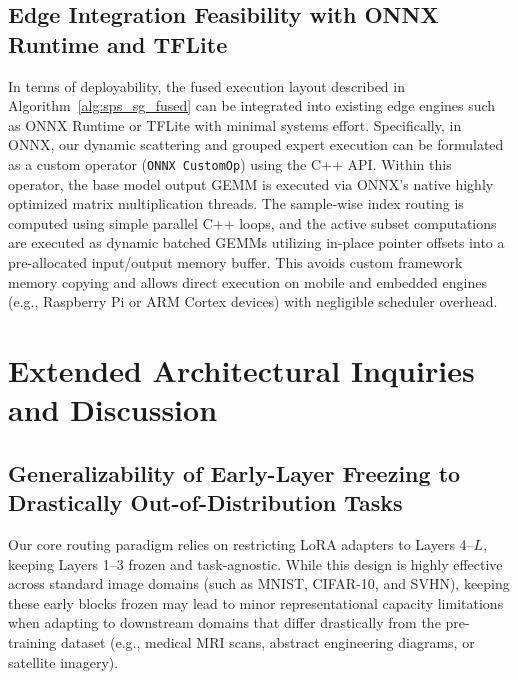 \documentclass{article}
\theoremstyle{plain}
\theoremstyle{definition}
\theoremstyle{remark}
\begin{document}
\subsection{Edge Integration Feasibility with ONNX Runtime and TFLite}
In terms of deployability, the fused execution layout described in Algorithm~\ref{alg:sps_sg_fused} can be integrated into existing edge engines such as ONNX Runtime or TFLite with minimal systems effort. Specifically, in ONNX, our dynamic scattering and grouped expert execution can be formulated as a custom operator (\texttt{ONNX CustomOp}) using the C++ API. Within this operator, the base model output GEMM is executed via ONNX's native highly optimized matrix multiplication threads. The sample-wise index routing is computed using simple parallel C++ loops, and the active subset computations are executed as dynamic batched GEMMs utilizing in-place pointer offsets into a pre-allocated input/output memory buffer. This avoids custom framework memory copying and allows direct execution on mobile and embedded engines (e.g., Raspberry Pi or ARM Cortex devices) with negligible scheduler overhead.

\section{Extended Architectural Inquiries and Discussion}
\label{sec:appendix_discussion}

\subsection{Generalizability of Early-Layer Freezing to Drastically Out-of-Distribution Tasks}
\label{subsec:appendix_ood}
Our core routing paradigm relies on restricting LoRA adapters to Layers 4--$L$, keeping Layers 1--3 frozen and task-agnostic. While this design is highly effective across standard image domains (such as MNIST, CIFAR-10, and SVHN), keeping these early blocks frozen may lead to minor representational capacity limitations when adapting to downstream domains that differ drastically from the pre-training dataset (e.g., medical MRI scans, abstract engineering diagrams, or satellite imagery).
\end{document}

